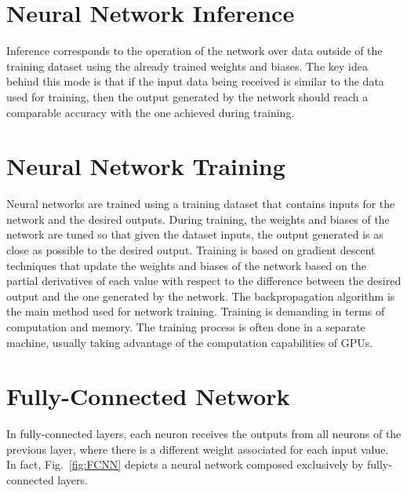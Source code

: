 \section{Neural Network Inference}
\label{section:inference}
Inference corresponds to the operation of the network over data outside of the
training dataset using the already trained weights and biases. The key idea
behind this mode is that if the input data being received is similar to the data
used for training, then the output generated by the network should reach a
comparable accuracy with the one achieved during training.

\section{Neural Network Training}
\label{section:training}
Neural networks are trained using a training dataset that contains inputs for
the network and the desired outputs. During training, the weights and biases of
the network are tuned so that given the dataset inputs, the output generated is
as close as possible to the desired output. Training is based on gradient
descent techniques that update the weights and biases of the network based on
the partial derivatives of each value with respect to the difference between the
desired output and the one generated by the network. The backpropagation
algorithm is the main method used for network training. Training is demanding in
terms of computation and memory. The training process is often done in a
separate machine, usually taking advantage of the computation capabilities of
GPUs.

\section{Fully-Connected Network}
\label{subsection:fc_network}

In fully-connected layers, each neuron receives the outputs from all neurons of
the previous layer, where there is a different weight associated for each input
value. In fact, Fig.~\ref{fig:FCNN} depicts a neural network composed
exclusively by fully-connected layers.




